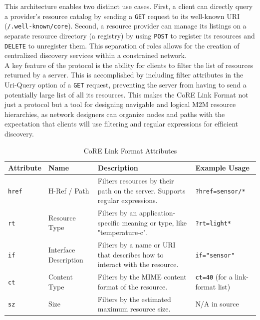 \documentclass{scrbook}
\begin{document}
This architecture enables two distinct use cases. First, a client can directly query a provider's resource catalog by sending a \texttt{GET} request to its well-known URI (\texttt{/.well-known/core}). Second, a resource provider can manage its listings on a separate resource directory (a registry) by using \texttt{POST} to register its resources and \texttt{DELETE} to unregister them. This separation of roles allows for the creation of centralized discovery services within a constrained network. \\

A key feature of the protocol is the ability for clients to filter the list of resources returned by a server. This is accomplished by including filter attributes in the Uri-Query option of a \texttt{GET} request, preventing the server from having to send a potentially large list of all its resources. This makes the CoRE Link Format not just a protocol but a tool for designing navigable and logical M2M resource hierarchies, as network designers can organize nodes and paths with the expectation that clients will use filtering and regular expressions for efficient discovery. \\

\begin{table}[h]
    \centering
    \begin{tabular}{|l|l|p{4cm}|l|}
        \hline
        \textbf{Attribute} & \textbf{Name} & \textbf{Description} & \textbf{Example Usage} \\
        \hline
        \texttt{href} & H-Ref / Path & Filters resources by their path on the server. Supports regular expressions. & \texttt{?href=sensor/*} \\
        \hline
        \texttt{rt} & Resource Type & Filters by an application-specific meaning or type, like "temperature-c". & \texttt{?rt=light*} \\
        \hline
        \texttt{if} & Interface Description & Filters by a name or URI that describes how to interact with the resource. & \texttt{if="sensor"} \\
        \hline
        \texttt{ct} & Content Type & Filters by the MIME content format of the resource. & \texttt{ct=40} (for a link-format list) \\
        \hline
        \texttt{sz} & Size & Filters by the estimated maximum resource size. & N/A in source \\
        \hline
    \end{tabular}
    \caption{CoRE Link Format Attributes}
\end{table}
\end{document}
